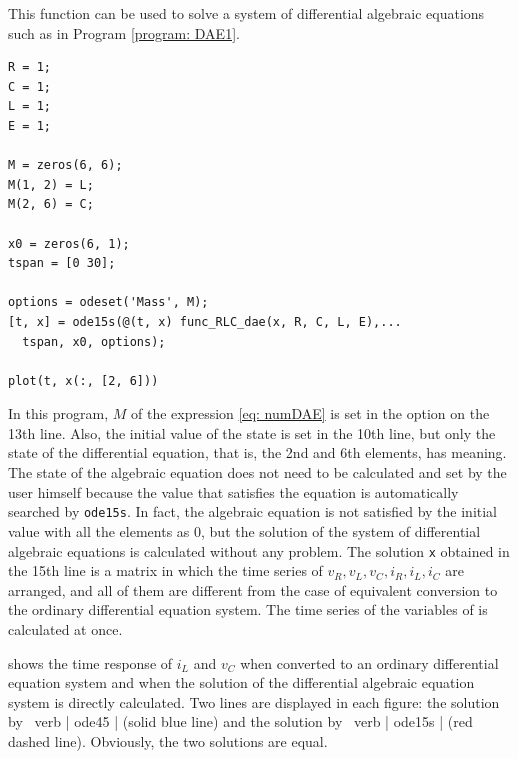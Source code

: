 \documentclass[tombow,dvipdfmx]{corona-a5-1.1}
\begin{document}
\begin{例}
This function can be used to solve a system of differential algebraic equations such as in Program \nobreak\ref{program: DAE1}.

\smallskip
\begin{PROGRAMA}[count,title={main\_RLC\_dae.m}]\label{program:DAE1}
\begin{verbatim}
R = 1;
C = 1;
L = 1;
E = 1;

M = zeros(6, 6);
M(1, 2) = L;
M(2, 6) = C;

x0 = zeros(6, 1);
tspan = [0 30];

options = odeset('Mass', M);
[t, x] = ode15s(@(t, x) func_RLC_dae(x, R, C, L, E),...
  tspan, x0, options);

plot(t, x(:, [2, 6]))
\end{verbatim}
\end{PROGRAMA}


In this program, $M$ of the expression \ref{eq: numDAE} is set in the option on the 13th line.
Also, the initial value of the state is set in the 10th line, but only the state of the differential equation, that is, the 2nd and 6th elements, has meaning.
The state of the algebraic equation does not need to be calculated and set by the user himself because the value that satisfies the equation is automatically searched by \verb|ode15s|.
In fact, the algebraic equation is not satisfied by the initial value with all the elements as $0$, but the solution of the system of differential algebraic equations is calculated without any problem.
The solution \verb|x| obtained in the 15th line is a matrix in which the time series of $v_R, v_L, v_C, i_R, i_L, i_C$ are arranged, and all of them are different from the case of equivalent conversion to the ordinary differential equation system.
The time series of the variables of is calculated at once.

 shows the time response of $ i_L $ and $ v_C $ when converted to an ordinary differential equation system and when the solution of the differential algebraic equation system is directly calculated. Two lines are displayed in each figure: the solution by \ verb | ode45 | (solid blue line) and the solution by \ verb | ode15s | (red dashed line). Obviously, the two solutions are equal.



\end{例}
\end{document}
